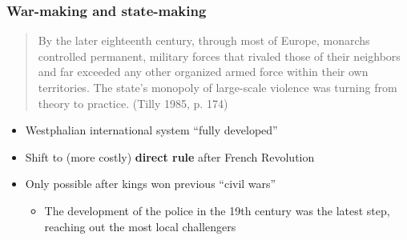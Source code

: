 \documentclass[aspectratio=43, handout]{beamer}
\begin{document}






\begin{frame}
\frametitle{War-making and state-making}
\centering

\begin{quote}
  By the later eighteenth century, through most of Europe, monarchs controlled permanent, military forces that rivaled those of their neighbors and far exceeded any other organized armed force within their own territories. The state's monopoly of large-scale violence was turning from theory to practice. (Tilly 1985, p. 174)
\end{quote}

\begin{itemize}
\item Westphalian international system ``fully developed''
\item<2-> Shift to (more costly) \textbf{direct rule} after French Revolution
\item<2-> Only possible after kings won previous ``civil wars''
  \begin{itemize}
    \item The development of the police in the 19th century was the latest step, reaching out the most local challengers
  \end{itemize}
\end{itemize}

\end{frame}

\end{document}

